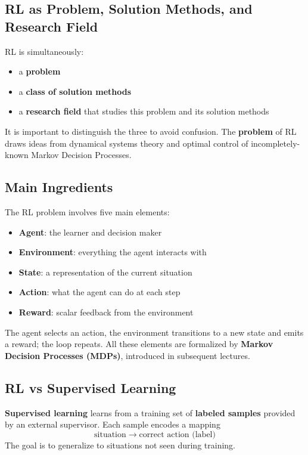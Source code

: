\documentclass[11pt,a4paper]{article}
\theoremstyle{definition}
\theoremstyle{plain}
\theoremstyle{remark}
\begin{document}
\subsection{RL as Problem, Solution Methods, and Research Field}

RL is simultaneously:
\begin{itemize}
    \item a \textbf{problem}
    \item a \textbf{class of solution methods}
    \item a \textbf{research field} that studies this problem and its solution methods
\end{itemize}

It is important to distinguish the three to avoid confusion. The \textbf{problem} of RL draws ideas from dynamical systems theory and optimal control of incompletely-known Markov Decision Processes.

\subsection{Main Ingredients}

The RL problem involves five main elements:

\begin{itemize}
    \item \textbf{Agent}: the learner and decision maker
    \item \textbf{Environment}: everything the agent interacts with
    \item \textbf{State}: a representation of the current situation
    \item \textbf{Action}: what the agent can do at each step
    \item \textbf{Reward}: scalar feedback from the environment
\end{itemize}

The agent selects an action, the environment transitions to a new state and emits a reward; the loop repeats. All these elements are formalized by \textbf{Markov Decision Processes (MDPs)}, introduced in subsequent lectures.

\subsection{RL vs Supervised Learning}

\textbf{Supervised learning} learns from a training set of \textbf{labeled samples} provided by an external supervisor. Each sample encodes a mapping
\[
    \text{situation} \;\to\; \text{correct action (label)}
\]
The goal is to generalize to situations not seen during training.
\end{document}
